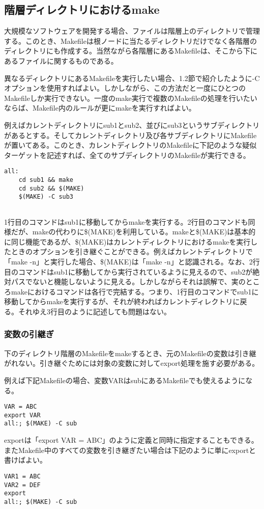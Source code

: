 \documentclass[dvipdfmx, 9pt, a4paper]{jsarticle}
\numberwithin{equation}{section}
\begin{document}
\subsection{階層ディレクトリにおけるmake}
大規模なソフトウェアを開発する場合、ファイルは階層上のディレクトリで管理する。このとき、Makefileは根ノードに当たるディレクトリだけでなく各階層のディレクトリにも作成する。当然ながら各階層にあるMakefileは、そこから下にあるファイルに関するものである。\par
異なるディレクトリにあるMakefileを実行したい場合、1.2節で紹介したように-Cオプションを使用すればよい。しかしながら、この方法だと一度にひとつのMakefileしか実行できない。一度のmake実行で複数のMakefileの処理を行いたいならば、Makefile内のルールが更にmakeを実行すればよい。\par
例えばカレントディレクトリにsub1とsub2、並びにsub3というサブディレクトリがあるとする。そしてカレントディレクトリ及び各サブディレクトリにMakefileが置いてある。このとき、カレントディレクトリのMakefileに下記のような疑似ターゲットを記述すれば、全てのサブディレクトリのMakefileが実行できる。
\begin{lstlisting}[caption=階層ディレクトリにおけるmake]
all:
	cd sub1 && make
	cd sub2 && $(MAKE)
	$(MAKE) -C sub3
	
\end{lstlisting}\par
1行目のコマンドはsub1に移動してからmakeを実行する。2行目のコマンドも同様だが、makeの代わりに\$(MAKE)を利用している。makeと\$(MAKE)は基本的に同じ機能であるが、\$(MAKE)はカレントディレクトリにおけるmakeを実行したときのオプションを引き継ぐことができる。例えばカレントディレクトリで「make -n」と実行した場合、\$(MAKE)は「make -n」と認識される。なお、2行目のコマンドはsub1に移動してから実行されているように見えるので、sub2が絶対パスでないと機能しないように見える。しかしながらそれは誤解で、実のところmakeにおけるコマンドは各行で完結する。つまり、1行目のコマンドでsub1に移動してからmakeを実行するが、それが終わればカレントディレクトリに戻る。それゆえ3行目のように記述しても問題はない。

\subsubsection{変数の引継ぎ}
下のディレクトリ階層のMakefileをmakeするとき、元のMakefileの変数は引き継がれない。引き継ぐためには対象の変数に対してexport処理を施す必要がある。\par
例えば下記Makefileの場合、変数VARはsubにあるMakefileでも使えるようになる。
\begin{lstlisting}[caption=変数の引継ぎ1]
VAR = ABC
export VAR
all:; $(MAKE) -C sub	
\end{lstlisting}\par
exportは「export VAR = ABC」のように定義と同時に指定することもできる。またMakefile中のすべての変数を引き継ぎたい場合は下記のように単にexportと書けばよい。
\begin{lstlisting}[caption=変数の引継ぎ2]
VAR1 = ABC
VAR2 = DEF
export
all:; $(MAKE) -C sub	
\end{lstlisting}
\end{document}
